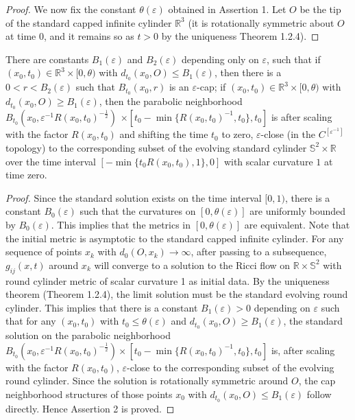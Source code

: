 \begin{proof}
We now fix the constant $\theta(\varepsilon)$ obtained in
Assertion 1. Let $O$ be the tip of the standard capped infinite
cylinder $\mathbb{R}^3$ (it is rotationally symmetric about $O$ at
time $0$, and it remains so as $t>0$ by the uniqueness Theorem
1.2.4).
\end{proof}

\begin{proposition}
  \label{prop:cz-standard-solution-early-time-cap-neck}

There are constants $B_1(\varepsilon)$ and $B_2(\varepsilon)$
depending only on $\varepsilon$, such that if $(x_0,t_0)\in
\mathbb{R}^3\times [0,\theta)$ with $d_{t_0}(x_0,O)\leq
B_{1}(\varepsilon)$, then there is a $0<r<B_2(\varepsilon)$ such
that $B_{t_0}(x_0,r)$ is an $\varepsilon$-cap; if $(x_0,t_0)\in
\mathbb{R}^3\times [0,\theta)$ with $d_{t_0}(x_0,O)\geq
B_1(\varepsilon)$, then the parabolic neighborhood
$B_{t_0}(x_0,\varepsilon^{-1}R(x_0,t_0)^{-\frac{1}{2}})$ $\times
[t_0-\min \{R(x_0,t_0)^{-1},t_0\},t_0]$ is after scaling with the
factor $R(x_0,t_0)$ and shifting the time $t_0$ to zero,
$\varepsilon$-close (in the $C^{[\varepsilon^{-1}]}$ topology) to
the corresponding subset of the evolving standard cylinder
$\mathbb{S}^2 \times \mathbb{R}$ over the time interval $[-\min
\{t_0R(x_0,t_0),1\},0]$ with scalar curvature $1$ at time zero.
\end{proposition}

\begin{proof}
Since the standard solution exists on the time interval $[0,1)$,
there is a constant $B_{0}(\varepsilon)$ such that the curvatures
on $[0,\theta(\varepsilon)]$ are uniformly bounded by
$B_{0}(\varepsilon)$. This implies that the metrics in
$[0,\theta(\varepsilon)]$ are equivalent.  Note that the initial
metric is asymptotic to the standard capped infinite cylinder. For
any sequence of points $x_{k}$ with $d_{0}(O,x_{k})\rightarrow
\infty$, after passing to a subsequence, $g_{ij}(x,t)$ around
$x_{k}$ will converge to a solution to the Ricci flow on
$\mathbb{R}\times \mathbb{S}^{2}$ with round cylinder metric of
scalar curvature 1 as initial data. By the uniqueness theorem
(Theorem 1.2.4), the limit solution must be the standard evolving
round cylinder.  This implies that there is a constant
$B_{1}(\varepsilon)>0$ depending on $\varepsilon$ such that for
any $(x_0,t_0)$ with $t_0\leq \theta(\varepsilon)$ and
$d_{t_0}(x_0,O)\geq B_{1}(\varepsilon)$, the standard solution on
the parabolic neighborhood
$B_{t_0}(x_0,\varepsilon^{-1}R(x_0,t_0)^{-\frac{1}{2}}) \times
[t_0-\min \{R(x_0,t_0)^{-1},t_0\},t_0]$ is, after scaling with the
factor $R(x_0,t_0)$, $\varepsilon$-close to the corresponding
subset of the evolving round cylinder. Since the solution is
rotationally symmetric around $O$, the cap neighborhood structures
of those points $x_0$ with $d_{t_0}(x_0,O)\leq B_{1}(\varepsilon)$
follow directly. Hence Assertion 2 is proved.
\end{proof}

